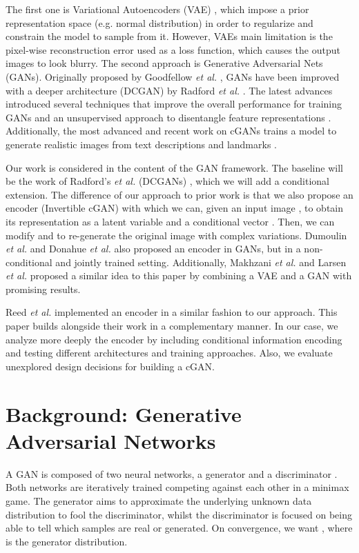 \documentclass{article}
\begin{document}
The first one is Variational Autoencoders (VAE) \citep{Gregor2015,Kingma2013,Rezende2014,Kingma2014}, which impose a prior representation space  (e.g. normal distribution) in order to regularize and constrain the model to sample from it.
However, VAEs main limitation is the pixel-wise reconstruction error used as a loss function, which causes the output images to look blurry.
The second approach is Generative Adversarial Nets (GANs). Originally proposed by Goodfellow \textit{et al.} \citep{Goodfellow2014}, GANs have been improved with a deeper architecture (DCGAN) by Radford \textit{et al.} \citep{Radford2015}. The latest advances introduced several techniques that improve the overall performance for training GANs \citep{Salimans2016} and an unsupervised approach to disentangle feature representations \citep{Chen2016}.
Additionally, the most advanced and recent work on cGANs trains a model to generate realistic images from text descriptions and landmarks \cite{Reed2016_2}.



Our work is considered in the content of the GAN framework. The baseline will be the work of Radford's \textit{et al.} (DCGANs) \citep{Radford2015}, which we will add a conditional extension. The difference of our approach to prior work is that we also propose an encoder (Invertible cGAN) with which we can, given an input image , to obtain its representation as a latent variable  and a conditional vector . Then, we can modify  and  to re-generate the original image with complex variations. 
Dumoulin \textit{et al.} \citep{Dumoulin2016} and Donahue \textit{et al.} \citep{Donahue2016} also proposed an encoder in GANs, but in a non-conditional and jointly trained setting.
Additionally, Makhzani \textit{et al.} \citep{Makhzani2015} and Larsen \textit{et al.} \citep{Larsen2015} proposed a similar idea to this paper by combining a VAE and a GAN with promising results.

Reed \textit{et al.} \citep{Reed2016} implemented an encoder in a similar fashion to our approach. This paper builds alongside their work in a complementary manner. In our case, we analyze more deeply the encoder by including conditional information encoding and testing different architectures and training approaches. Also, we evaluate unexplored design decisions for building a cGAN. 
\section{Background: Generative Adversarial Networks} \label{sec:GANs}
A GAN is composed of two neural networks, a generator  and a discriminator . Both networks are iteratively trained competing against each other in a minimax game. The generator aims to approximate the underlying unknown data distribution  to fool the discriminator, whilst the discriminator is focused on being able to tell which samples are real or generated. On convergence, we want , where  is the generator distribution. 
\end{document}
